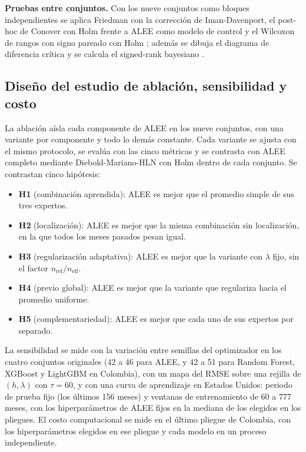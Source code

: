 \documentclass[11pt]{article}
\begin{document}
\textbf{Pruebas entre conjuntos.} Con los nueve conjuntos como bloques independientes se aplica Friedman con la corrección de Iman-Davenport, el post-hoc de Conover con Holm frente a ALEE como modelo de control y el Wilcoxon de rangos con signo pareado con Holm \cite{demsar2006,garciaherrera2008}; además se dibuja el diagrama de diferencia crítica y se calcula el signed-rank bayesiano \cite{benavoli2014}.

\subsection{Diseño del estudio de ablación, sensibilidad y costo}
\label{sec:ablacion}

La ablación aísla cada componente de ALEE en los nueve conjuntos, con una variante por componente y todo lo demás constante. Cada variante se ajusta con el mismo protocolo, se evalúa con las cinco métricas y se contrasta con ALEE completo mediante Diebold-Mariano-HLN con Holm dentro de cada conjunto. Se contrastan cinco hipótesis:
\begin{itemize}\setlength\itemsep{0pt}
\item \textbf{H1} (combinación aprendida): ALEE es mejor que el promedio simple de sus tres expertos.
\item \textbf{H2} (localización): ALEE es mejor que la misma combinación sin localización, en la que todos los meses pasados pesan igual.
\item \textbf{H3} (regularización adaptativa): ALEE es mejor que la variante con $\lambda$ fijo, sin el factor $n_{\mathrm{ref}}/n_{\mathrm{eff}}$.
\item \textbf{H4} (previo global): ALEE es mejor que la variante que regulariza hacia el promedio uniforme.
\item \textbf{H5} (complementariedad): ALEE es mejor que cada uno de sus expertos por separado.
\end{itemize}
La sensibilidad se mide con la variación entre semillas del optimizador en los cuatro conjuntos originales (42 a 46 para ALEE, y 42 a 51 para Random Forest, XGBoost y LightGBM en Colombia), con un mapa del RMSE sobre una rejilla de $(h,\lambda)$ con $\tau=60$, y con una curva de aprendizaje en Estados Unidos: periodo de prueba fijo (los últimos 156 meses) y ventanas de entrenamiento de 60 a 777 meses, con los hiperparámetros de ALEE fijos en la mediana de los elegidos en los pliegues. El costo computacional se mide en el último pliegue de Colombia, con los hiperparámetros elegidos en ese pliegue y cada modelo en un proceso independiente.
\end{document}
